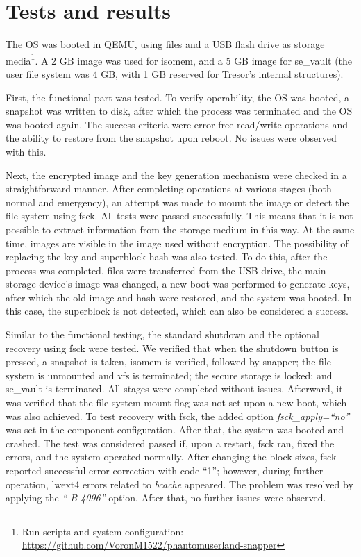 \section{Tests and results}

The OS was booted in QEMU, using files and a USB flash drive as storage media\footnote{Run scripts and system configuration: \url{https://github.com/VoronM1522/phantomuserland-snapper}}. A 2 GB image was used for isomem, and a 5 GB image for se\_vault (the user file system was 4 GB, with 1 GB reserved for Tresor’s internal structures).

First, the functional part was tested. To verify operability, the OS was booted, a snapshot was written to disk, after which the process was terminated and the OS was booted again. The success criteria were error-free read/write operations and the ability to restore from the snapshot upon reboot. No issues were observed with this.

Next, the encrypted image and the key generation mechanism were checked in a straightforward manner. After completing operations at various stages (both normal and emergency), an attempt was made to mount the image or detect the file system using fsck. All tests were passed successfully. This means that it is not possible to extract information from the storage medium in this way. At the same time, images are visible in the image used without encryption. The possibility of replacing the key and superblock hash was also tested. To do this, after the process was completed, files were transferred from the USB drive, the main storage device’s image was changed, a new boot was performed to generate keys, after which the old image and hash were restored, and the system was booted. In this case, the superblock is not detected, which can also be considered a success.

Similar to the functional testing, the standard shutdown and the optional recovery using fsck were tested. We verified that when the shutdown button is pressed, a snapshot is taken, isomem is verified, followed by snapper; the file system is unmounted and vfs is terminated; the secure storage is locked; and se\_vault is terminated. All stages were completed without issues. Afterward, it was verified that the file system mount flag was not set upon a new boot, which was also achieved. To test recovery with fsck, the added option \textit{fsck\_apply=“no”} was set in the component configuration. After that, the system was booted and crashed. The test was considered passed if, upon a restart, fsck ran, fixed the errors, and the system operated normally. After changing the block sizes, fsck reported successful error correction with code “1”; however, during further operation, lwext4 errors related to \textit{bcache} appeared. The problem was resolved by applying the \textit{“-B 4096”} option. After that, no further issues were observed.


